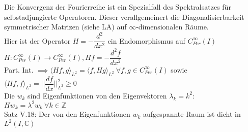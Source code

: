   \begin{remark}
    Die Konvergenz der Fourierreihe ist ein Spezialfall des Spektralsatzes für selbstadjungierte Operatoren. Dieser verallgemeinert die Diagonalisierbarkeit symmetrischer Matrizen (siehe LA) auf $\infty$-dimensionalen Räume.\\
    Hier ist der Operator $H = -\dfrac{d^2}{dx^2}$ ein Endomorphismus auf $C_{Per}^{\infty}(I)$\\
    $H:C_{Per}^{\infty}(I) \to C_{Per}^{\infty}(I), Hf=-\dfrac{d^2f}{dx^2}$\\
    Part. Int. $\implies \langle Hf,g \rangle_{L^2} = \langle f,Hg \rangle_{L^2} \ \forall f,g \in C_{Per}^{\infty}(I)$ sowie $\langle Hf, f \rangle_{L^2} = ||\dfrac{df}{dx}||_{L^2}^2 \geq 0$\\
    Die $w_k$ sind Eigenfunktionen von den Eigenvektoren $\lambda_k = k^2$:\\
    $Hw_k = \lambda^2 w_k \ \forall k \in \mathbb{Z}$\\
    Satz V.18: Der von den Eigenfunktionen $w_k$ aufgespannte Raum ist dicht in $L^2(I, \mathbb{C})$
  \end{remark}